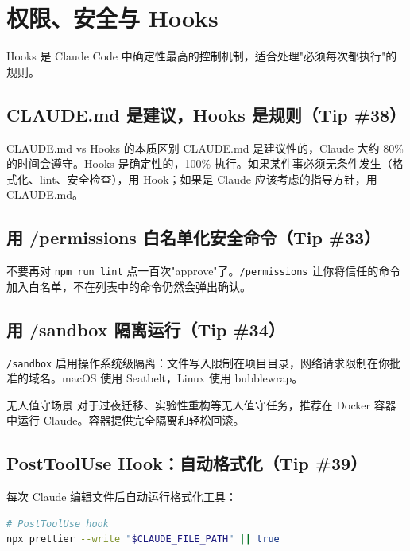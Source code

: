 \section{权限、安全与 Hooks}

Hooks 是 Claude Code 中确定性最高的控制机制，适合处理"必须每次都执行"的规则。

\subsection{CLAUDE.md 是建议，Hooks 是规则（Tip \#38）}

\begin{importantbox}{CLAUDE.md vs Hooks 的本质区别}
CLAUDE.md 是建议性的，Claude 大约 80\% 的时间会遵守。Hooks 是确定性的，100\% 执行。如果某件事必须无条件发生（格式化、lint、安全检查），用 Hook；如果是 Claude 应该考虑的指导方针，用 CLAUDE.md。
\end{importantbox}

\subsection{用 /permissions 白名单化安全命令（Tip \#33）}

不要再对 \texttt{npm run lint} 点一百次"approve"了。\texttt{/permissions} 让你将信任的命令加入白名单，不在列表中的命令仍然会弹出确认。

\subsection{用 /sandbox 隔离运行（Tip \#34）}

\texttt{/sandbox} 启用操作系统级隔离：文件写入限制在项目目录，网络请求限制在你批准的域名。macOS 使用 Seatbelt，Linux 使用 bubblewrap。

\begin{knowledgebox}{无人值守场景}
对于过夜迁移、实验性重构等无人值守任务，推荐在 Docker 容器中运行 Claude。容器提供完全隔离和轻松回滚。
\end{knowledgebox}

\subsection{PostToolUse Hook：自动格式化（Tip \#39）}

每次 Claude 编辑文件后自动运行格式化工具：

\begin{lstlisting}[caption={PostToolUse Hook 配置（.claude/settings.json）}, language=bash]
# PostToolUse hook
npx prettier --write "$CLAUDE_FILE_PATH" || true
\end{lstlisting}

